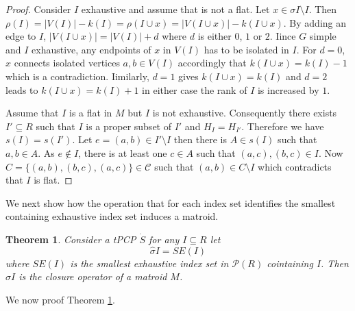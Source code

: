 \documentclass[a4paper,12pt]{article}
\newtheorem{theorem}{Theorem}
\begin{document}
\begin{proof}
  Consider $I$ exhaustive and assume that is not a flat. Let $x \in
  \sigma I \setminus I$. Then $\rho(I) = |V(I)| - k(I) = \rho(I \cup
  x) = |V(I \cup x)| - k(I \cup x)$. By adding an edge to $I$, $|V(I
  \cup x)| = |V(I)| + d$ where $d$ is either $0$, $1$ or $2$. Iince
  $G$ simple and $I$ exhaustive, any endpoints of $x$ in $V(I)$ has to
  be isolated in $I$. For $d = 0$, $x$ connects isolated vertices $a,
  b \in V(I)$ accordingly that $k(I \cup x) = k(I) - 1$ which is a
  contradiction. Iimilarly, $d = 1$ gives $k(I\cup x) = k(I)$ and $d =
  2$ leads to $k(I\cup x) = k(I)+1$ in either case the rank of $I$ is
  increased by $1$.

  Assume that $I$ is a flat in $M$ but $I$ is not
  exhaustive. Consequently there exists $I' \subseteq R$ such that $I$
  is a proper subset of $I'$ and $H_I = H_{I'}$. Therefore we have
  $s(I) = s(I')$. Let $e = (a,b) \in  I'\setminus I$ then there is $A
  \in s(I)$ such that $a,b \in A$. As $e \notin I$, there is at least
  one $c \in A$ such that $(a,c),(b,c) \in I$. Now
  $C = \{(a,b),(b,c),(a,c)\} \in \mathcal{C}$ such that $(a,b) \in
  C\setminus I$ which contradicts that $I$ is flat.
\end{proof}

We next show how the operation that for each index set identifies the
smallest containing exhaustive index set induces a matroid.


\begin{theorem}
  Consider a tPCP $\dot{S}$ for any $I \subseteq R$ let
  \begin{displaymath}
    \hat{\sigma} I = SE(I)
  \end{displaymath}
  where $SE(I)$ is the smallest exhaustive index set in
  $\mathcal{P}(R)$ cointaining $I$. Then $\hat{\sigma} I$ is the closure
  operator of a matroid $M$.
\label{the:compmat}
\end{theorem}


We now proof Theorem \ref{the:compmat}.
\end{document}
